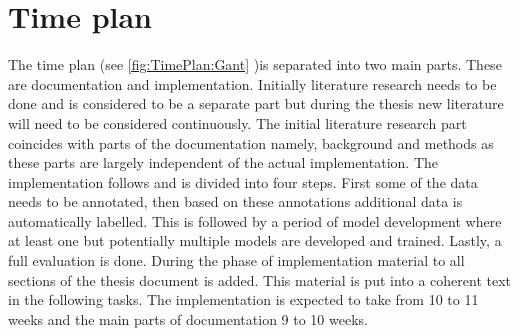\documentclass[a4paper,11pt]{article}
\begin{document}

\section{Time plan}

The time plan (see \autoref{fig:TimePlan:Gant} )is separated into two main parts. These are documentation and implementation. Initially literature research needs to be done and is considered to be a separate part but during the thesis new literature will need to be considered continuously. The initial literature research part coincides with parts of the documentation namely, background and methods as these parts are largely independent of the actual implementation. The implementation follows and is divided into four steps. First some of the data needs to be annotated, then based on these annotations additional data is automatically labelled. This is followed by a period of model development where at least one but potentially multiple models are developed and trained. Lastly, a full evaluation is done. During the phase of implementation material to all sections of the thesis document is added. This material is put into a coherent text in the following tasks. The implementation is expected to take from 10 to 11 weeks and the main parts of documentation 9 to 10 weeks.
\end{document}
